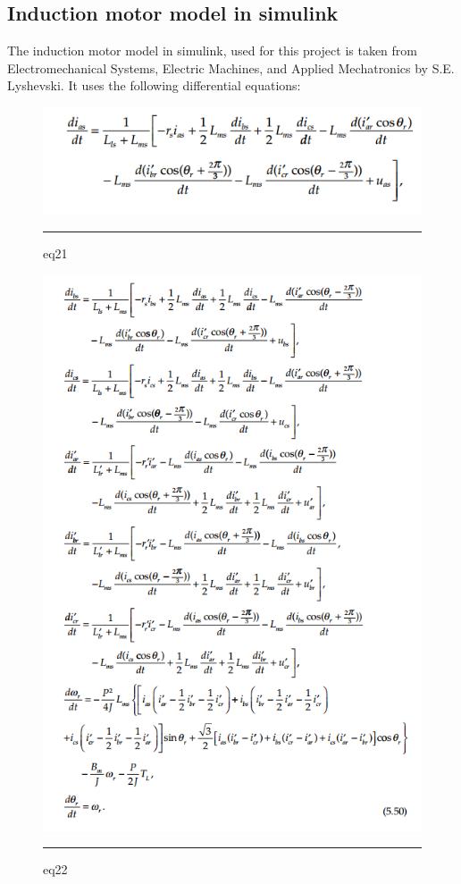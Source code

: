 \subsection{Induction motor model in simulink}
The induction motor model in simulink, used for this project is taken from Electromechanical Systems, Electric Machines, and Applied Mechatronics by  S.E. Lyshevski\cite{lyshevski2018electromechanical}. It uses the following differential equations:
\begin{figure}[htbp]
	\centering
		\includegraphics[width = 4.5in]{./Figures/MS/eq23.png}
		\rule{35em}{0.5pt}
	\caption{eq21}
\end{figure}
\begin{figure}[htbp]
	\centering
		\includegraphics[width = 4.5in]{./Figures/MS/eq24.png}
		\rule{35em}{0.5pt}
	\caption{eq22}
\end{figure}

